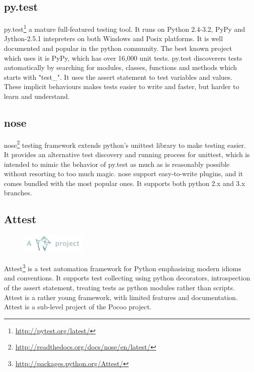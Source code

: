 \subsection{py.test}
py.test\footnote{\url{http://pytest.org/latest/}} a mature full-featured testing
tool. It runs on Python 2.4-3.2, PyPy and Jython-2.5.1 intepreters on both
Windows and Posix platforms. It is well documented and popular in the python
community. The best known project which uses it is PyPy, which has over 16,000
unit tests. py.test discoverers tests automatically by searching for modules,
classes, functions and methods which starts with "test\_". It uses the assert
statement to test variables and values. These implicit behaviours makes tests
easier to write and faster, but harder to learn and understand.

\subsection{nose}
nose\footnote{\url{http://readthedocs.org/docs/nose/en/latest/}} testing
framework extends python's unittest library to make testing easier.
It provides an alternative test discovery and running process for unittest,
which is intended to mimic the behavior of py.test as much as is reasonably
possible without resorting to too much magic. nose support easy-to-write
plugins, and it comes bundled with the most popular ones. It supports both
python 2.x and 3.x branches.

\subsection{Attest}
\begin{figure}
	\vspace{-20pt}
	\includegraphics[width=3.2cm]{./planning/img/pocoo_logo}
	\vspace{-30pt}
\end{figure}
Attest\footnote{\url{http://packages.python.org/Attest/}} is a test automation
framework for Python emphasising modern idioms and conventions. It supports
test collecting using python decorators, introspection of the assert statement,
treating tests as python modules rather than scripts. Attest is a rather young
framework, with limited features and documentation. Attest is a sub-level
project of the Pocoo project.

